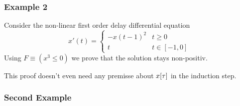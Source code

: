 \documentclass[10pt]{report}
\begin{document}
            \subsubsection{Example 2}
                \label{sec:ddi-example-2}
                Consider the non-linear first order delay differential equation
                \begin{equation}
                    x'(t) = \begin{cases}
                         -x(t-1)^2 & t \geq 0\\
                         t & t \in [-1,0]
                    \end{cases}
                \end{equation}
                Using $F\equiv(x^3\leq 0)$ we prove that the solution stays non-positiv.
                \begin{sequentdeduction}
                \end{sequentdeduction}
                This proof doesn't even need any premisse about $\xtau$ in the induction step.
            \subsubsection{Second Example}
            \label{sec:second-example}
\end{document}
